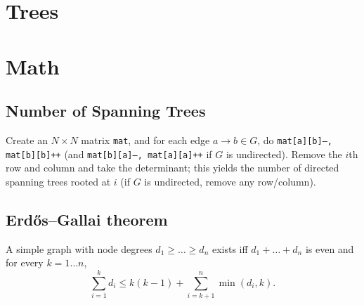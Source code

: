 \section{Trees}

\section{Math}
	\subsection{Number of Spanning Trees}
		Create an $N\times N$ matrix \texttt{mat}, and for each edge $a \rightarrow b \in G$, do
		\texttt{mat[a][b]--, mat[b][b]++} (and \texttt{mat[b][a]--, mat[a][a]++} if $G$ is undirected).
		Remove the $i$th row and column and take the determinant; this yields the number of directed spanning trees rooted at $i$
		(if $G$ is undirected, remove any row/column).

	\subsection{Erdős–Gallai theorem}
		A simple graph with node degrees $d_1 \ge \dots \ge d_n$ exists iff $d_1 + \dots + d_n$ is even and for every $k = 1\dots n$,
		\[ \sum _{i=1}^{k}d_{i}\leq k(k-1)+\sum _{i=k+1}^{n}\min(d_{i},k). \]

